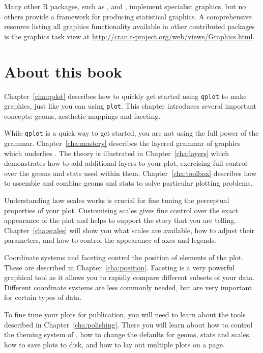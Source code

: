 Many other R packages, such as  \citep{meyer:2006},  \citep{plotrix} and  \citep{gplots}, implement specialist graphics, but no others provide a framework for producing statistical graphics.  A comprehensive resource listing all graphics functionality available in other contributed packages is the graphics task view at \url{http://cran.r-project.org/web/views/Graphics.html}.  

\section{About this book}

Chapter~\ref{cha:qplot} describes how to quickly get started using {\tt qplot} to make graphics, just like you can using {\tt plot}.  This chapter introduces several important \ggplot concepts: geoms, aesthetic mappings and faceting.
  
While {\tt qplot} is a quick way to get started, you are not using the full power of the grammar.  Chapter~\ref{cha:mastery} describes the layered grammar of graphics which underlies \ggplot.  The theory is illustrated in Chapter~\ref{cha:layers} which demonstrates how to add additional layers to your plot, exercising full control over the geoms and stats used within them.  Chapter~\ref{cha:toolbox} describes how to assemble and combine geoms and stats to solve particular plotting problems.

Understanding how scales works is crucial for fine tuning the perceptual properties of your plot.  Customising scales gives fine control over the exact appearance of the plot and helps to support the story that you are telling.  Chapter~\ref{cha:scales} will show you what scales are available, how to adjust their parameters, and how to control the appearance of axes and legends.

Coordinate systems and faceting control the position of elements of the plot.  These are described in Chapter~\ref{cha:position}.  Faceting is a very powerful graphical tool as it allows you to rapidly compare different subsets of your data.  Different coordinate systems are less commonly needed, but are very important for certain types of data.

To fine tune your plots for publication, you will need to learn about the tools described in Chapter~\ref{cha:polishing}.  There you will learn about how to control the theming system of \ggplot, how to change the defaults for geoms, stats and scales, how to save plots to disk, and how to lay out multiple plots on a page.

